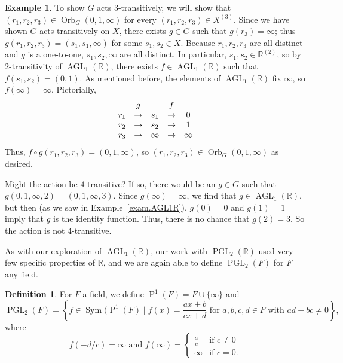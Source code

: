 \documentclass[11pt]{amsart}
\theoremstyle{plain}
\theoremstyle{definition}
\newtheorem*{definition*}{Definition}
\newtheorem{example}{Example}
\theoremstyle{remark}
\DeclareMathOperator{\Sym}{Sym}
\DeclareMathOperator{\AGL}{AGL}
\DeclareMathOperator{\PGL}{PGL}
\DeclareMathOperator{\Proj}{P}
\DeclareMathOperator{\Orb}{Orb}
\begin{document}
\begin{example}
To show $G$ acts $3$-transitively, we will show that $(r_1,r_2,r_3)\in \Orb_G(0,1,\infty)$ for every $(r_1,r_2,r_3)\in X^{(3)}$. Since we have shown $G$ acts transitively on $X$, there exists $g\in G$ such that $g(r_3) = \infty$; thus $g(r_1,r_2,r_3) = (s_1,s_1,\infty)$ for some $s_1,s_2\in X$.  Because $r_1,r_2,r_3$ are all distinct and $g$ is a one-to-one, $s_1,s_2,\infty$ are all distinct. In particular, $s_1,s_2 \in \mathbb{R}^{(2)}$, so by $2$-transitivity of $\AGL_1(\mathbb{R})$, there exists $f\in \AGL_1(\mathbb{R})$ such that $f(s_1,s_2) = (0,1)$. As mentioned before, the elements of $\AGL_1(\mathbb{R})$ fix $\infty$, so $f(\infty) = \infty$. Pictorially,
\[\begin{array}{ccccc}
\footnotesize
    & g           &        & f           & \\
r_1 & \rightarrow & s_1   & \rightarrow & 0\\
r_2 & \rightarrow & s_2   & \rightarrow & 1\\
r_3 & \rightarrow & \infty & \rightarrow & \infty\\
\end{array}\]
Thus, $f\circ g(r_1,r_2,r_3) = (0,1,\infty)$, so $(r_1,r_2,r_3)\in \Orb_G(0,1,\infty)$ as desired.

Might the action be $4$-transitive? If so, there would be an $g\in G$ such that $g (0,1,\infty,2) = (0,1,\infty,3)$. Since $g(\infty) = \infty$, we find that $g\in \AGL_1(\mathbb{R})$, but then (as we saw in Example~\ref{exam.AGL1R}), $g(0) = 0$ and $g(1) = 1$ imply that $g$ is the identity function. Thus, there is no chance that $g(2) = 3$. So the action is not $4$-transitive.
\end{example}

As with our exploration of $\AGL_1(\mathbb{R})$, our work with $\PGL_2(\mathbb{R})$ used very few specific properties of $\mathbb{R}$, and we are again able to define $\PGL_2(F)$ for $F$ any field.

\begin{definition*}
For $F$ a field, we define $\Proj^1(F) = F \cup \{\infty\}$ and \[\PGL_2(F) = \left\{ f \in \Sym(\Proj^1(F) \mid \text{$f(x) = \frac{ax+b}{cx+d}$ for $a,b,c,d\in F$ with $ad-bc\neq 0$}\right\},\]
where
\[f(-d/c) = \infty \text{ and } f(\infty) = \begin{cases} \frac{a}{c} &  \text{if $c\neq 0$}\\ \infty &  \text{if $c= 0$}.\end{cases}\]
\end{definition*}
\end{document}
